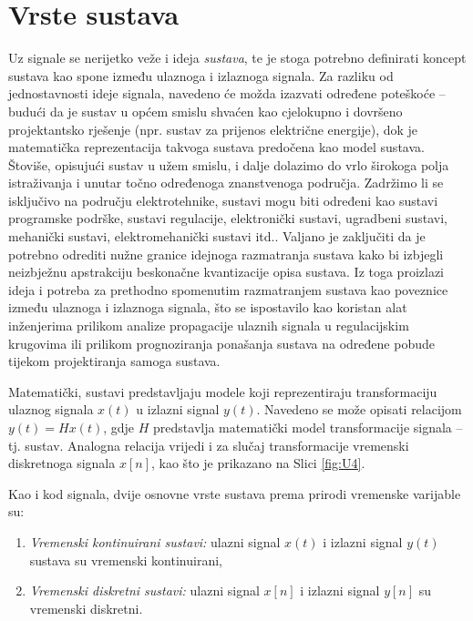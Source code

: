 \documentclass[a4paper,12pt,oneside]{memoir}
\begin{document}
        \section{Vrste sustava}
            Uz signale se nerijetko veže i ideja \textit{sustava}, te je stoga potrebno definirati koncept sustava kao spone između ulaznoga i izlaznoga signala. Za razliku od jednostavnosti ideje signala, navedeno će možda izazvati određene poteškoće -- budući da je sustav u općem smislu shvaćen kao cjelokupno i dovršeno projektantsko rješenje (npr. sustav za prijenos električne energije), dok je matematička reprezentacija takvoga sustava predočena kao model sustava. Štoviše, opisujući sustav u užem smislu, i dalje dolazimo do vrlo širokoga polja istraživanja i unutar točno određenoga znanstvenoga područja. Zadržimo li se isključivo na području elektrotehnike, sustavi mogu biti određeni kao sustavi programske podrške, sustavi regulacije, elektronički sustavi, ugradbeni sustavi, mehanički sustavi, elektromehanički sustavi itd.. Valjano je zaključiti da je potrebno odrediti nužne granice idejnoga razmatranja sustava kako bi izbjegli neizbježnu apstrakciju beskonačne kvantizacije opisa sustava. Iz toga proizlazi ideja i potreba za prethodno spomenutim razmatranjem sustava kao poveznice između ulaznoga i izlaznoga signala, što se ispostavilo kao koristan alat inženjerima prilikom analize propagacije ulaznih signala u regulacijskim krugovima ili prilikom prognoziranja ponašanja sustava na određene pobude tijekom projektiranja samoga sustava.

            Matematički, sustavi predstavljaju modele koji reprezentiraju transformaciju ulaznog signala $x(t)$ u izlazni signal $y(t)$. Navedeno se može opisati relacijom $y(t)=Hx(t)$, gdje $H$ predstavlja matematički model transformacije signala -- tj. sustav. Analogna relacija vrijedi i za slučaj transformacije vremenski diskretnoga signala $x[n]$, kao što je prikazano na Slici \ref{fig:U4}.
            
            Kao i kod signala, dvije osnovne vrste sustava prema prirodi vremenske varijable su:
            \begin{enumerate}
                \item \textit{Vremenski kontinuirani sustavi:} ulazni signal $x(t)$ i izlazni signal $y(t)$ sustava su vremenski kontinuirani,
                \item \textit{Vremenski diskretni sustavi:} ulazni signal $x[n]$ i izlazni signal $y[n]$ su vremenski diskretni.
            \end{enumerate}
\end{document}
